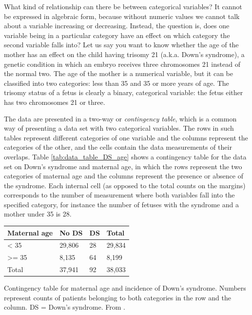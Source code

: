 \documentclass[
  letterpaper,
  DIV=11,
  numbers=noendperiod]{scrreprt}
\begin{document}
What kind of relationship can there be between categorical variables? It
cannot be expressed in algebraic form, because without numeric values we
cannot talk about a variable increasing or decreasing. Instead, the
question is, does one variable being in a particular category have an
effect on which category the second variable falls into? Let us say you
want to know whether the age of the mother has an effect on the child
having trisomy 21 (a.k.a. Down's syndrome), a genetic condition in which
an embryo receives three chromosomes 21 instead of the normal two. The
age of the mother is a numerical variable, but it can be classified into
two categories: less than 35 and 35 or more years of age. The trisomy
status of a fetus is clearly a binary, categorical variable: the fetus
either has two chromosomes 21 or three.

The data are presented in a two-way or \emph{contingency table}, which
is a common way of presenting a data set with two categorical variables.
The rows in such tables represent different categories of one variable
and the columns represent the categories of the other, and the cells
contain the data measurements of their overlaps. Table
\ref{tab:data_table_DS_age} shows a contingency table for the data set
on Down's syndrome and maternal age, in which the rows represent the two
categories of maternal age and the columns represent the presence or
absence of the syndrome. Each internal cell (as opposed to the total
counts on the margins) corresponds to the number of measurement where
both variables fall into the specified category, for instance the number
of fetuses with the syndrome and a mother under 35 is 28.

\begin{longtable}[]{@{}llll@{}}
\toprule()
Maternal age & No DS & DS & Total \\
\midrule()
\endhead
\textless{} 35 & 29,806 & 28 & 29,834 \\
\textgreater= 35 & 8,135 & 64 & 8,199 \\
Total & 37,941 & 92 & 38,033 \\
\bottomrule()
\end{longtable}

Contingency table for maternal age and incidence of Down's syndrome.
Numbers represent counts of patients belonging to both categories in the
row and the column. DS = Down's syndrome. From
\cite{malone_first-trimester_2005}.
\end{document}
